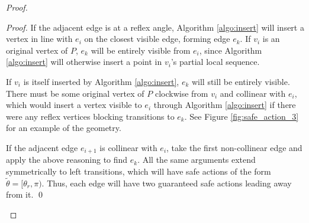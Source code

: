 \documentclass[]{styles/svproc}  %
\begin{document}
\begin{proof}
\begin{proof}
If the adjacent edge is at a reflex angle, Algorithm 
\ref{algo:insert} will insert a vertex in line with $e_i$ on the closest visible
edge, forming edge $e_k$. If $v_i$ is an original
vertex of $P$, $e_k$ will be entirely visible from $e_i$, since Algorithm
\ref{algo:insert} will otherwise insert a point in $v_i$'s partial local
sequence.

If $v_i$ is itself inserted by Algorithm \ref{algo:insert}, $e_k$ will still be
entirely visible. There must be some original vertex of $P$
clockwise from $v_i$ and collinear with $e_i$, which would insert a vertex
visible to $e_i$ through Algorithm \ref{algo:insert} if there were any reflex vertices
blocking transitions to $e_k$.
See Figure \ref{fig:safe_action_3} for an example of the geometry.

If the adjacent edge $e_{i+1}$ is collinear with $e_i$, take the first
non-collinear edge and apply the above reasoning to find $e_k$.
All the same arguments extend symmetrically to left transitions, which will have
safe actions of the form $\tilde{\theta} = [\theta_r, \pi)$. Thus, each edge will 
have two guaranteed safe actions leading away from it. \qed
\end{proof}


\end{proof}
\end{document}
